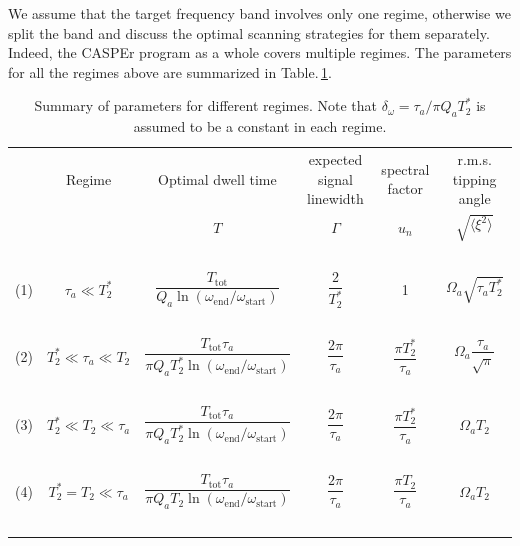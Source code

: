 \documentclass{WileyMSP-template}
\newcommand{\AW}[1]{\textcolor{cyan}{Arne: #1}}
\begin{document}
	

	We assume that the target frequency band involves only one regime, otherwise we split the band and discuss the optimal scanning strategies for them separately. Indeed, the CASPEr program as a whole covers multiple regimes.
	The parameters for all the regimes above are summarized in Table.\,\ref{tab:summary_of_regimes}. 
	\begin{table}[ht]
		\centering
		\caption{Summary of parameters for different regimes. Note that $\delta_\omega = \tau_a/\pi Q_a T_2^*$ is assumed to be a constant in each regime. } %
	\begin{tabular}{cccccc}
		\hline
		\, & Regime & Optimal dwell time & expected signal linewidth & spectral factor  & r.m.s. tipping angle  \\
		\, &  & $T$ & $\Gamma$ & $u_n$ & $\sqrt{\langle \xi^2\rangle} $ \\
		\hline
		\, & &   &  &   &   \\
		(1) & $\tau_a \ll T_2^*$ & $\dfrac{T_{\mathrm{tot}}}{Q_a \ln{ \left( \omega_{\mathrm{end}}/\omega_{\mathrm{start}} \right) }}$ 
		& $\dfrac{2}{T_2^*}$ & 1 & $\Omega_{a}\sqrt{\tau_a T_2^*}$\\
		\, & &   &  &   &   \\
		(2) & $T_2^* \ll \tau_a \ll T_2$ &  $ \dfrac{T_{\mathrm{tot}}\tau_a}{\pi Q_a T_2^*\ln{ \left( \omega_{\mathrm{end}}/\omega_{\mathrm{start}} \right)}} $ 
		& $\dfrac{2\pi}{\tau_a}$ & $\dfrac{\pi T_2^*}{\tau_a}$ & $\Omega_a\dfrac{\tau_a}{\sqrt{\pi}}$ \\
		\, & &   &  &   &   \\
		(3) & $T_2^* \ll T_2 \ll \tau_a$ & $ \dfrac{T_{\mathrm{tot}}\tau_a}{\pi Q_a T_2^*\ln{ \left( \omega_{\mathrm{end}}/\omega_{\mathrm{start}} \right)}}  $ 
		& $\dfrac{2\pi}{\tau_a}$ & $\dfrac{\pi T_2^*}{\tau_a}$ & $\Omega_aT_2$\\
		\, & &   &  &   &   \\
		(4) & $T_2^*=T_2 \ll \tau_a$ & $\dfrac{ T_{\mathrm{tot}} \tau_a }{\pi  Q_a T_2 \ln \left(\omega_{\mathrm{end}}/\omega_{\mathrm{start}}\right)}$ 
		& $\dfrac{2\pi}{\tau_a}$ & $\dfrac{\pi T_2}{\tau_a}$ & $\Omega_a T_2$ \\
		\, & &   &  &   &   \\
		\hline
	\end{tabular}
	\label{tab:summary_of_regimes}
\end{table}
\end{document}
